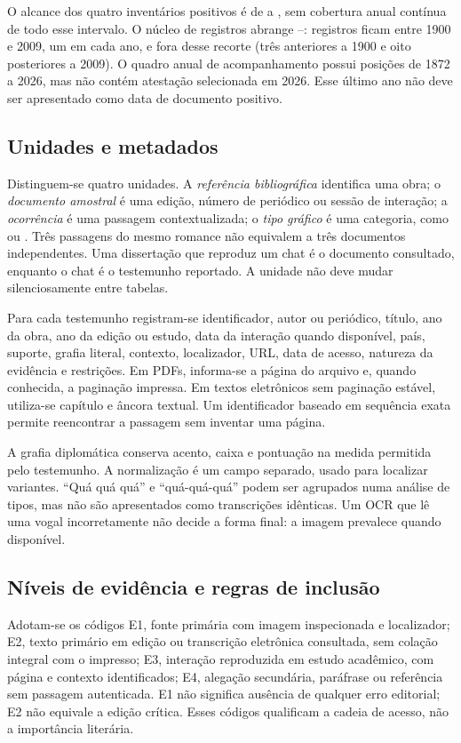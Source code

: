 O alcance dos quatro inventários positivos é de \SelectedMinYear{} a \SelectedMaxYear{}, sem cobertura anual contínua de todo esse intervalo. O núcleo de \CorpusSize{} registros abrange \CoreMinYear{}--\CoreMaxYear{}: \CoreWithin{} registros ficam entre 1900 e 2009, um em cada ano, e \CoreOutside{} fora desse recorte (três anteriores a 1900 e oito posteriores a 2009). O quadro anual de acompanhamento possui posições de 1872 a 2026, mas não contém atestação selecionada em 2026. Esse último ano não deve ser apresentado como data de documento positivo.

\subsection{Unidades e metadados}
Distinguem-se quatro unidades. A \emph{referência bibliográfica} identifica uma obra; o \emph{documento amostral} é uma edição, número de periódico ou sessão de interação; a \emph{ocorrência} é uma passagem contextualizada; o \emph{tipo gráfico} é uma categoria, como  ou . Três passagens do mesmo romance não equivalem a três documentos independentes. Uma dissertação que reproduz um chat é o documento consultado, enquanto o chat é o testemunho reportado. A unidade não deve mudar silenciosamente entre tabelas.

Para cada testemunho registram-se identificador, autor ou periódico, título, ano da obra, ano da edição ou estudo, data da interação quando disponível, país, suporte, grafia literal, contexto, localizador, URL, data de acesso, natureza da evidência e restrições. Em PDFs, informa-se a página do arquivo e, quando conhecida, a paginação impressa. Em textos eletrônicos sem paginação estável, utiliza-se capítulo e âncora textual. Um identificador baseado em sequência exata permite reencontrar a passagem sem inventar uma página.

A grafia diplomática conserva acento, caixa e pontuação na medida permitida pelo testemunho. A normalização é um campo separado, usado para localizar variantes. ``Quá quá quá'' e ``quá-quá-quá'' podem ser agrupados numa análise de tipos, mas não são apresentados como transcrições idênticas. Um OCR que lê uma vogal incorretamente não decide a forma final: a imagem prevalece quando disponível.

\subsection{Níveis de evidência e regras de inclusão}
Adotam-se os códigos E1, fonte primária com imagem inspecionada e localizador; E2, texto primário em edição ou transcrição eletrônica consultada, sem colação integral com o impresso; E3, interação reproduzida em estudo acadêmico, com página e contexto identificados; E4, alegação secundária, paráfrase ou referência sem passagem autenticada. E1 não significa ausência de qualquer erro editorial; E2 não equivale a edição crítica. Esses códigos qualificam a cadeia de acesso, não a importância literária.

